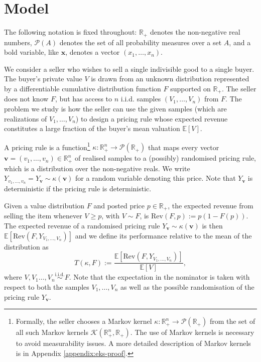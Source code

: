 \documentclass[11pt]{article}
\newcommand{\E}{\mathbb{E}}
\newcommand{\Rplus}{\mathbb{R}_+}
\newcommand{\iid}{\overset{\text{i.i.d.}}{\sim}}
\newcommand{\Rev}{\mathrm{Rev}}
\begin{document}
\section{Model}
\label{sec:model}

The following notation is fixed throughout: $\mathbb{R}_+$ denotes the non-negative real numbers, $\mathcal{P}(A)$ denotes the set of all probability measures over a set $A$, and a bold variable, like $\boldsymbol{x}$, denotes a vector $(x_1, \dots, x_n)$.

We consider a seller who wishes to sell a single indivisible good to a single buyer. The buyer’s private value $V$ is drawn from an unknown distribution represented by a differentiable cumulative distribution function $F$  supported on $\Rplus$. 
The seller does not know $F$, but has access to $n$ i.i.d. samples $(V_1,\dots,V_n)$ from $F$. The problem we study is how the seller can use the given samples (which are realizations of $V_1,\dots,V_n$) to design a pricing rule whose expected revenue constitutes a large fraction of the buyer's mean valuation $\E[V]$. %

A pricing rule is a function\footnote{Formally, the seller chooses a Markov kernel $\kappa:\Rplus^n \to \mathcal{P}(\Rplus)$ from the set of all such Markov kernels $\mathcal{K}(\Rplus^n,\Rplus)$. The use of Markov kernels is necessary to avoid measurability issues. A more detailed description of Markov kernels is in Appendix \ref{appendix:eks-proof}.} $\kappa:\Rplus^n \to \mathcal{P}(\Rplus)$ that maps every vector $\boldsymbol{v} = (v_1,\dots,v_n) \in \Rplus^n$ of realised samples to a (possibly) randomised pricing rule, which is a distribution over the non-negative reals. We write $Y_{v_1,\dots,v_n}  = Y_{\boldsymbol{v}} \sim\kappa(\boldsymbol{v})$ for a random variable denoting this price. Note that $Y_{\boldsymbol{v}}$ is deterministic if the pricing rule is deterministic.

Given a value distribution $F$ and posted price $p \in \Rplus$, the expected revenue from selling the item whenever $V \geq p$, with $V \sim F$, is
$
\Rev(F,p):=p(1 - F(p)).
$
The expected revenue of a randomised pricing rule $Y_{\boldsymbol{v}} \sim \kappa(\boldsymbol{v})$ is then $\E[\Rev(F,Y_{V_1,\dots,V_n})]$ and we define its performance relative to the mean of the distribution as
$$
T(\kappa,F):=\frac{\E[\Rev(F,Y_{V_1,\dots,V_n})]}{\E[V]},
$$
where $V,V_1\dots,V_n\iid F$. Note that the expectation in the nominator is taken with respect to both the samples $V_1,\dots,V_n$ as well as the possible randomisation of the pricing rule $Y_{\boldsymbol{v}}$. 
\end{document}
